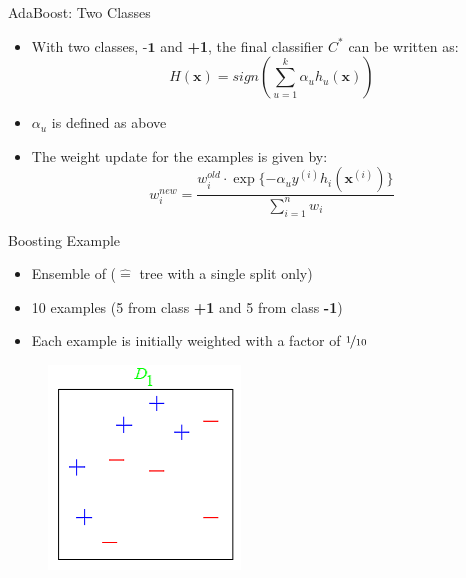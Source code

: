 \begin{frame}{AdaBoost: Two Classes}{}
	\begin{itemize}
		\item With two classes, $\textbf{-1}$ and \textbf{+1}, the final classifier $C^*$ can be written as:
		\begin{equation}
			H(\bm{x}) = sign \left( \sum_{u=1}^k \alpha_u h_u(\bm{x}) \right)
		\end{equation}
		\item $\alpha_u$ is defined as above
		\item The weight update for the examples is given by:
		\begin{equation}
			w_i^{new} = \frac{w_i^{old} \cdot \exp \{ -\alpha_u y^{(i)} h_i(\bm{x}^{(i)}) \}}{\sum_{i=1}^n w_i}
		\end{equation}
	\end{itemize}
\end{frame}


\begin{frame}{Boosting Example}{}
	\begin{itemize}
		\item Ensemble of  ($\widehat{=}$ tree with a single split only)
		\item 10 examples (5 from class \textbf{+1} and 5 from class \textbf{-1})
		\item Each example is initially weighted with a factor of $\nicefrac{1}{10}$
	\end{itemize}

	\begin{figure}
		\includegraphics[scale=0.50]{08_decision_trees/02_img/boosting_example}
	\end{figure}
\end{frame}


